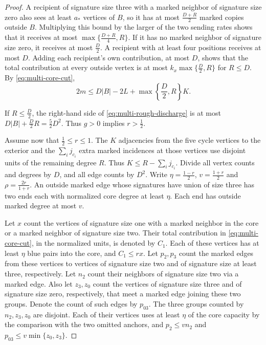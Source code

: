 \begin{proof}
A recipient of signature size three with a marked neighbor of
signature size zero also sees at least $a_*$ vertices of $B$, so it
has at most $\frac{D+R}{2}$ marked copies outside $B$. Multiplying
this bound by the larger of the two sending rates shows that it
receives at most $\max\{\frac{D+R}{4},R\}$. If it has no marked
neighbor of signature size zero, it receives at most $\frac{D}{2}$.
A recipient with at least four positions receives at most $D$.
Adding each recipient's own contribution, at most $D$, shows that
the total contribution at every outside vertex is at most
$k_x\max\{\frac{D}{2},R\}$ for $R\le D$. By \eqref{eq:multi-core-cut},
\begin{equation}\label{eq:multi-rough-discharge}
2m\le D|B|-2L+\max\left\{\frac{D}{2},R\right\}K.
\end{equation}

If $R\le \frac{D}{2}$, the right-hand side of \eqref{eq:multi-rough-discharge}
is at most $D|B|+\frac{D}{2}R=\frac{5}{2}D^2$.
Thus $g>0$ implies $r>\frac{1}{2}$.

Assume now that $\frac{1}{2}\le r\le1$. The $K$ adjacencies from the
five cycle vertices to the exterior and the $\sum_i j_{c_i}$ extra marked
incidences at those vertices use disjoint units of the remaining
degree $R$. Thus $K\le R-\sum_i j_{c_i}$.
Divide all vertex counts and degrees by $D$, and all
edge counts by $D^2$. Write $\eta=\frac{1-r}{2}$, $v=\frac{1+r}{2}$
and $\rho=\frac{2r}{1+r}$. An outside marked edge whose signatures
have union of size three has two ends each with normalized core
degree at least $\eta$. Each end has outside marked degree at most
$v$.

Let $x$ count the vertices of signature size one with a marked
neighbor in the core or a marked neighbor of signature size two.
Their total contribution in \eqref{eq:multi-core-cut}, in the
normalized units, is denoted by $C_1$. Each of these vertices has
at least $\eta$ blue pairs into the core, and $C_1\le rx$. Let
$p_2,p_3$ count the marked edges from these vertices to vertices of
signature size two and of signature size at least three, respectively.
Let $n_2$ count their neighbors of signature size two via a marked
edge. Also let $z_3,z_0$ count the vertices of signature size three
and of signature size zero, respectively, that meet a marked edge
joining these two groups. Denote the count of such edges by $p_{03}$.
The three groups counted by $n_2,z_3,z_0$ are disjoint. Each of their
vertices uses at least $\eta$ of the core capacity by the comparison
with the two omitted anchors, and $p_2\le v n_2$ and
$p_{03}\le v\min\{z_0,z_3\}$.


\end{proof}
